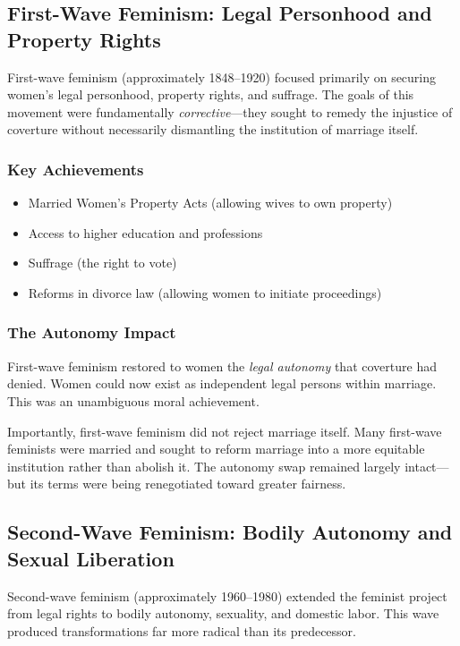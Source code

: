 \documentclass[12pt, letterpaper]{article}
\begin{document}
\subsection{First-Wave Feminism: Legal Personhood and Property Rights}

First-wave feminism (approximately 1848--1920) focused primarily on securing women's legal personhood, property rights, and suffrage. The goals of this movement were fundamentally \textit{corrective}---they sought to remedy the injustice of coverture without necessarily dismantling the institution of marriage itself.

\subsubsection{Key Achievements}

\begin{itemize}
    \item Married Women's Property Acts (allowing wives to own property)
    \item Access to higher education and professions
    \item Suffrage (the right to vote)
    \item Reforms in divorce law (allowing women to initiate proceedings)
\end{itemize}

\subsubsection{The Autonomy Impact}

First-wave feminism restored to women the \textit{legal autonomy} that coverture had denied. Women could now exist as independent legal persons within marriage. This was an unambiguous moral achievement.

Importantly, first-wave feminism did not reject marriage itself. Many first-wave feminists were married and sought to reform marriage into a more equitable institution rather than abolish it. The autonomy swap remained largely intact---but its terms were being renegotiated toward greater fairness.

\subsection{Second-Wave Feminism: Bodily Autonomy and Sexual Liberation}

Second-wave feminism (approximately 1960--1980) extended the feminist project from legal rights to bodily autonomy, sexuality, and domestic labor. This wave produced transformations far more radical than its predecessor.
\end{document}
